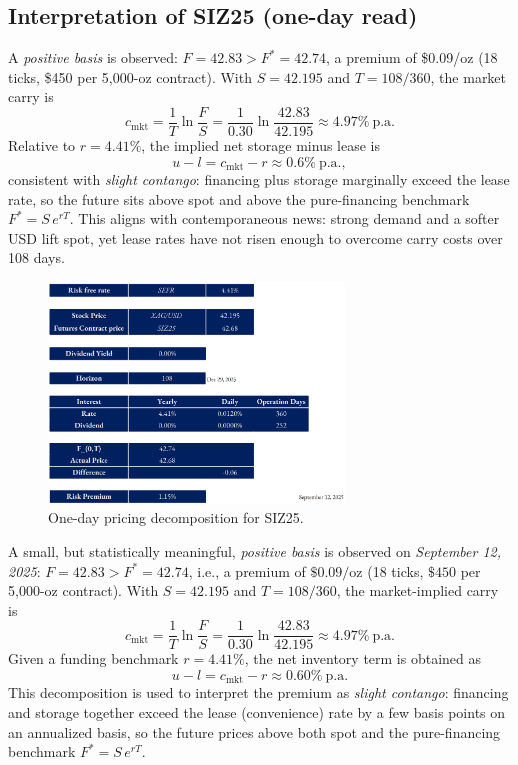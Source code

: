 \documentclass[10pt,a4paper]{article} %
\begin{document}
\subsection{Interpretation of \texorpdfstring{SIZ25}{SIZ25} (one-day read)}
A \emph{positive basis} is observed: \(F=42.83>F^{*}=42.74\), a premium of \$0.09/oz (18 ticks, \$450 per 5{,}000-oz contract). With \(S=42.195\) and \(T=108/360\), the market carry is
\[
c_{\mathrm{mkt}}=\frac{1}{T}\ln\!\frac{F}{S}
=\frac{1}{0.30}\ln\!\frac{42.83}{42.195}\approx 4.97\%\ \text{p.a.}
\]
Relative to \(r=4.41\%\), the implied net storage minus lease is
\[
u-l=c_{\mathrm{mkt}}-r\approx 0.6\%\ \text{p.a.},
\]
consistent with \emph{slight contango}: financing plus storage marginally exceed the lease rate, so the future sits above spot and above the pure-financing benchmark \(F^{*}=S\,e^{rT}\). This aligns with contemporaneous news: strong demand and a softer USD lift spot, yet lease rates have not risen enough to overcome carry costs over 108 days.

\begin{figure}[h]
\centering
\includegraphics[width=0.7\textwidth]{figures/silver_pricing_one_day.png}
\caption{One-day pricing decomposition for SIZ25.}
\label{fig:silver_one_day}
\end{figure}


A small, but statistically meaningful, \emph{positive basis} is observed on \emph{September 12, 2025}: \(F=42.83>F^{*}=42.74\), i.e., a premium of \(\$0.09/\mathrm{oz}\) (18 ticks, \(\$450\) per 5{,}000-oz contract). With \(S=42.195\) and \(T=108/360\), the market-implied carry is
\[
c_{\mathrm{mkt}}=\frac{1}{T}\ln\!\frac{F}{S}=\frac{1}{0.30}\ln\!\frac{42.83}{42.195}\approx 4.97\% \ \text{p.a.}
\]
Given a funding benchmark \(r=4.41\%\), the net inventory term is obtained as
\[
u-l=c_{\mathrm{mkt}}-r\approx 0.60\%\ \text{p.a.}
\]
This decomposition is used to interpret the premium as \emph{slight contango}: financing and storage together exceed the lease (convenience) rate by a few basis points on an annualized basis, so the future prices above both spot and the pure-financing benchmark \(F^{*}=S\,e^{rT}\).
\end{document}
